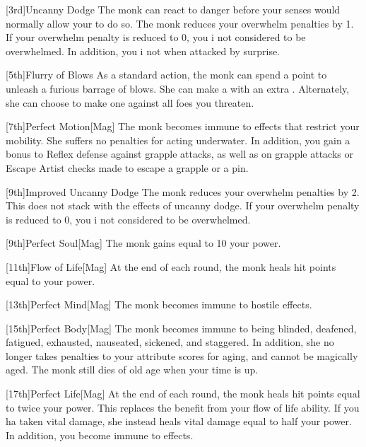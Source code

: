         [3rd]{Uncanny Dodge}
        The monk can react to danger before your senses would normally allow your to do so.
        The monk reduces your overwhelm penalties by 1.
        If your overwhelm penalty is reduced to 0, you i not considered to be overwhelmed.
        In addition, you i not \unaware when attacked by surprise.

        [5th]{Flurry of Blows}\label{Flurry of Blows}
        As a standard action, the monk can spend a \ki point to unleash a furious barrage of blows.
        She can make a  with an extra .
        Alternately, she can choose to make one  against all foes you threaten.

        [7th]{Perfect Motion}[Mag]
        The monk becomes immune to effects that restrict your mobility.
        She suffers no penalties for acting underwater.
        In addition, you gain a  bonus to Reflex defense against grapple attacks, as well as on grapple attacks or Escape Artist checks made to escape a grapple or a pin.

        [9th]{Improved Uncanny Dodge}
        The monk reduces your overwhelm penalties by 2.
        This does not stack with the effects of uncanny dodge.
        If your overwhelm penalty is reduced to 0, you i not considered to be overwhelmed.

        [9th]{Perfect Soul}[Mag]
        The monk gains  equal to 10 \add your \ki power.

        [11th]{Flow of Life}[Mag]
        At the end of each round, the monk heals hit points equal to your \ki power.

        [13th]{Perfect Mind}[Mag]
        The monk becomes immune to hostile  effects.

        [15th]{Perfect Body}[Mag]
        The monk becomes immune to being blinded, deafened, fatigued, exhausted, nauseated, sickened, and staggered.
        In addition, she no longer takes penalties to your attribute scores for aging, and cannot be magically aged.
        The monk still dies of old age when your time is up.

        [17th]{Perfect Life}[Mag]
        At the end of each round, the monk heals hit points equal to twice your \ki power.
        This replaces the benefit from your flow of life ability.
        If you ha taken vital damage, she instead heals vital damage equal to half your \ki power.
        In addition, you become immune to  effects.

